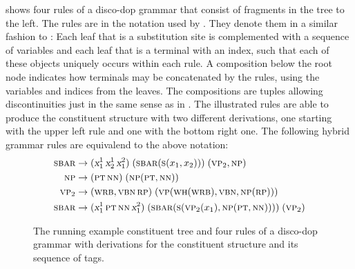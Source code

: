 \documentclass[../document.tex]{subfiles}
\begin{document}
    \begin{example}\label{ex:dop}
         shows four rules of a disco-dop grammar that consist of fragments in the tree to the left.
        The rules are in the notation used by \citet{Cra15}.
        They denote them in a similar fashion to :
            Each leaf that is a substitution site is complemented with a sequence of variables and each leaf that is a terminal with an index, such that each of these objects uniquely occurs within each rule.
            A composition below the root node indicates how terminals may be concatenated by the rules, using the variables and indices from the leaves.
            The compositions are tuples allowing discontinuities just in the same sense as in .
        The illustrated rules are able to produce the constituent structure with two different derivations, one starting with the upper left rule and one with the bottom right one.
        The following hybrid grammar rules are equivalend to the above notation: \begin{align*}
            \textsc{sbar} &\to (\textsl{x}_1^1 \, \textsl{x}_2^1 \, \textsl{x}_1^2)\;(\textsc{sbar} (\textsc{s} (x_1, x_2)))\;(\textsc{vp}_2, \textsc{np}) \\
            \textsc{np} &\to (\textsc{pt} \, \textsc{nn})\;(\textsc{np} (\textsc{pt}, \textsc{nn})) \\
            \textsc{vp}_2 &\to (\textsc{wrb}, \textsc{vbn} \, \textsc{rp})\;(\textsc{vp} (\textsc{wh}(\textsc{wrb}),\textsc{vbn},\textsc{np}(\textsc{rp}))) \\
            \textsc{sbar} &\to (\textsl{x}_1^1 \, \textsc{pt} \, \textsc{nn} \, \textsl{x}_1^2)\;(\textsc{sbar} (\textsc{s} (\textsc{vp}_2(x_1),\textsc{np}(\textsc{pt}, \textsc{nn}))))\;(\textsc{vp}_2)
        \end{align*}
    \end{example}
    
    \begin{figure}
        \null\hfill
        
        \hspace{1cm}
        
        \hfill\null
        \caption{\label{fig:ex:dop}
            The running example constituent tree and four rules of a disco-dop grammar with derivations for the constituent structure and its sequence of  tags.}
    \end{figure}
    
    \ifSubfilesClassLoaded{%
        \printindex
    }{}
\end{document}
